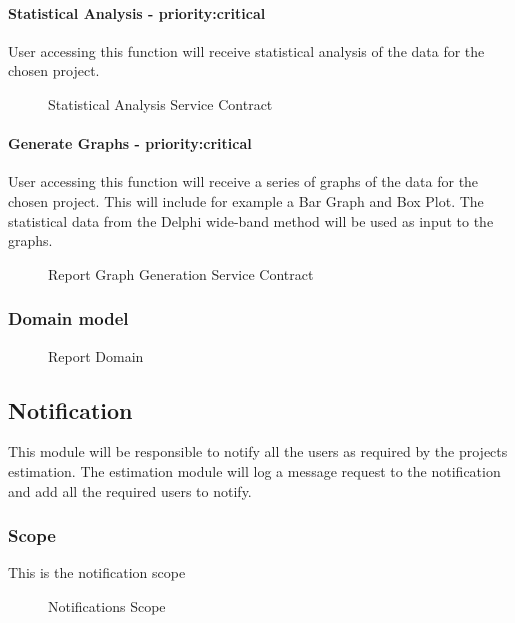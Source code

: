 	\paragraph{Statistical Analysis - priority:critical}
	User accessing this function will receive statistical analysis of the data for the chosen project.
	\begin{figure}[H]
	    	\centering
	    	\caption{Statistical Analysis Service Contract}
	    	\label{fig:Report_getStatistics.png Contract}
   	\end{figure}
	\paragraph{Generate Graphs - priority:critical}
	User accessing this function will receive a series of graphs of the data for the chosen project. 
	This will include for example a Bar Graph and Box Plot. The statistical data from the Delphi wide-band method 
	will be used as input to the graphs.
	\begin{figure}[H]
	    	\centering
	    	\caption{Report Graph Generation Service Contract}
	    	\label{fig:Report_GraphGeneration.png Contract}
   	\end{figure}

\subsubsection{Domain model}
	\begin{figure}[H]
	    	\centering
	    	\caption{Report Domain}
	    	\label{fig:Report_Domain.png}
   	\end{figure}
\subsection{Notification}
This module will be responsible to notify all the users as required by the projects estimation. The estimation module will log a message request to the notification and add all the required users to notify.
\subsubsection{Scope}
This is the notification scope
	\begin{figure}[H]
	    	\centering
	    	\caption{Notifications Scope}
	    	\label{fig:Notification_Scope}
   	\end{figure}
